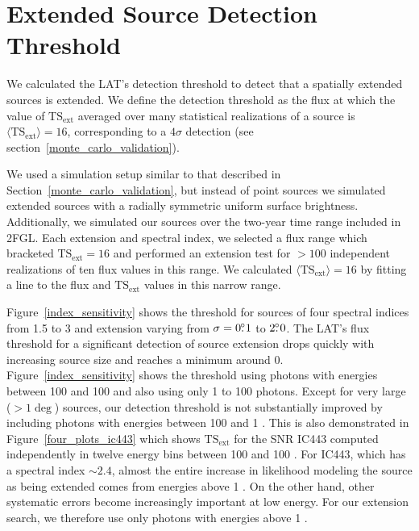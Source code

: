 \documentclass[12pt,preprint]{aastex}
\newcommand{\mev}{\text{MeV}\xspace}
\newcommand{\gev}{\text{GeV}\xspace}
\newcommand{\tsext}{{\ensuremath{\text{TS}_{\text{ext}}}}\xspace}
\begin{document}
\section{Extended Source Detection Threshold}
\label{extension_sensitivity}

We calculated the LAT's detection threshold to detect that a spatially extended
sources is extended. We define the detection threshold as the flux at which the value
of $\tsext$ averaged over many statistical realizations of a source
is $\langle\tsext\rangle=16$, corresponding to a $4\sigma$ detection
(see section~\ref{monte_carlo_validation}).

We used a simulation setup similar to that described in
Section~\ref{monte_carlo_validation}, but instead of point sources
we simulated extended
sources with a radially symmetric uniform surface
brightness. Additionally, we
simulated our sources over the two-year time range included
in 2FGL.
Each extension and
spectral index, we selected a flux range which bracketed $\tsext=16$
and performed an extension test for $>100$ independent realizations of
ten flux values in this range.
We calculated $\langle\tsext\rangle=16$ by fitting a line to the flux
and $\tsext$ values in this narrow range.

Figure~\ref{index_sensitivity} shows the threshold for sources of four
spectral indices from 1.5 to 3 and extension varying from $\sigma=0\mbox{$.\!\!^\circ$}1$
to $2\mbox{$.\!\!^\circ$}0$.  The LAT's flux threshold for a significant detection
of source extension drops quickly with
increasing source size and reaches a minimum around 0. 
Figure~\ref{index_sensitivity} shows
the threshold using photons with energies between 100 \mev and 100 \gev
and also using only 1 \gev to 100 \gev photons.
Except for very large ($>1\deg$) sources, our detection threshold is
not substantially improved by including photons with energies between 100 \mev and
1 \gev.  This is also demonstrated in Figure~\ref{four_plots_ic443}
which shows \tsext for the SNR IC443 computed independently in twelve
energy bins between 100 \mev and 100 \gev. For IC443, which has a
spectral index $\sim2.4$, almost the entire increase in likelihood
modeling the source as being extended comes
from energies above 1 \gev.  On the other hand, other systematic errors
become increasingly important at low energy. For our extension search,
we therefore use only photons with energies above 1 \gev.
\end{document}
